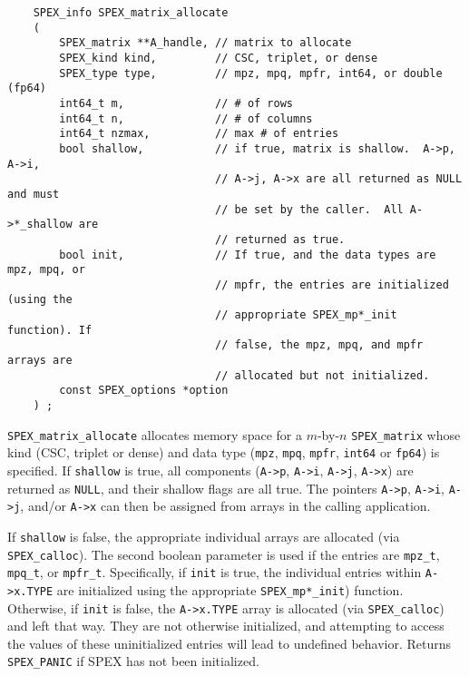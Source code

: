 \documentclass[12pt]{report}
\theoremstyle{definition}
\begin{document}
\begin{mdframed}[userdefinedwidth=6in]
{\footnotesize
\begin{verbatim}
    SPEX_info SPEX_matrix_allocate
    (
        SPEX_matrix **A_handle, // matrix to allocate
        SPEX_kind kind,         // CSC, triplet, or dense
        SPEX_type type,         // mpz, mpq, mpfr, int64, or double (fp64)
        int64_t m,              // # of rows
        int64_t n,              // # of columns
        int64_t nzmax,          // max # of entries
        bool shallow,           // if true, matrix is shallow.  A->p, A->i,
                                // A->j, A->x are all returned as NULL and must
                                // be set by the caller.  All A->*_shallow are
                                // returned as true.
        bool init,              // If true, and the data types are mpz, mpq, or
                                // mpfr, the entries are initialized (using the
                                // appropriate SPEX_mp*_init function). If
                                // false, the mpz, mpq, and mpfr arrays are
                                // allocated but not initialized.
        const SPEX_options *option
    ) ;
\end{verbatim}
} \end{mdframed}

\verb|SPEX_matrix_allocate| allocates memory space for a $m$-by-$n$
\verb|SPEX_matrix| whose kind (CSC, triplet or dense) and data type
(\verb|mpz|, \verb|mpq|, \verb|mpfr|, \verb|int64| or \verb|fp64|) is
specified. If \verb|shallow| is true, all components (\verb|A->p|, \verb|A->i|,
\verb|A->j|, \verb|A->x|) are returned as \verb|NULL|, and their shallow flags
are all true.  The pointers \verb|A->p|, \verb|A->i|, \verb|A->j|,
and/or \verb|A->x| can then be assigned from arrays in the calling application.

If \verb|shallow| is false, the appropriate individual arrays are allocated
(via \verb|SPEX_calloc|). The second boolean parameter is used if the entries
are \verb|mpz_t|, \verb|mpq_t|, or \verb|mpfr_t|. Specifically, if \verb|init|
is true, the individual entries within \verb|A->x.TYPE| are initialized using
the appropriate \verb|SPEX_mp*_init|) function. Otherwise, if \verb|init| is
false, the \verb|A->x.TYPE| array is allocated (via \verb|SPEX_calloc|) and
left that way.  They are not otherwise initialized, and attempting to access
the values of these uninitialized entries will lead to undefined behavior.
Returns \verb|SPEX_PANIC| if SPEX has not been initialized.
\end{document}
